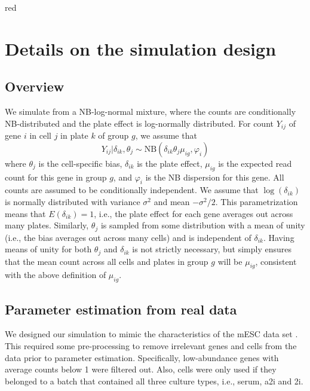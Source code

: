\documentclass{article}
\begin{document}
\begin{color}{red}
\section{Details on the simulation design}

\subsection{Overview}
We simulate from a NB-log-normal mixture, where the counts are conditionally NB-distributed and the plate effect is log-normally distributed.
For count $Y_{ij}$ of gene $i$ in cell $j$ in plate $k$ of group $g$, we assume that
\[
    Y_{ij} | \delta_{ik}, \theta_j \sim \mbox{NB}(\delta_{ik}\theta_j\mu_{ig}, \varphi_i)
\]
where $\theta_j$ is the cell-specific bias, $\delta_{ik}$ is the plate effect, $\mu_{ig}$ is the expected read count for this gene in group $g$, and $\varphi_i$ is the NB dispersion for this gene.
All counts are assumed to be conditionally independent.
We assume that $\log(\delta_{ik})$ is normally distributed with variance $\sigma^2$ and mean $-\sigma^2/2$.
This parametrization means that $E(\delta_{ik}) = 1$, i.e., the plate effect for each gene averages out across many plates.
Similarly, $\theta_j$ is sampled from some distribution with a mean of unity (i.e., the bias averages out across many cells) and is independent of $\delta_{ik}$.
Having means of unity for both $\theta_j$ and $\delta_{ik}$ is not strictly necessary, but simply ensures that the mean count across all cells and plates in group $g$ will be $\mu_{ig}$, consistent with the above definition of $\mu_{ig}$.

\subsection{Parameter estimation from real data}
We designed our simulation to mimic the characteristics of the mESC data set \citep{kolod2015single}.
This required some pre-processing to remove irrelevant genes and cells from the data prior to parameter estimation.
Specifically, low-abundance genes with average counts below 1 were filtered out.
Also, cells were only used if they belonged to a batch that contained all three culture types, i.e., serum, a2i and 2i.


\end{color}
\end{document}
